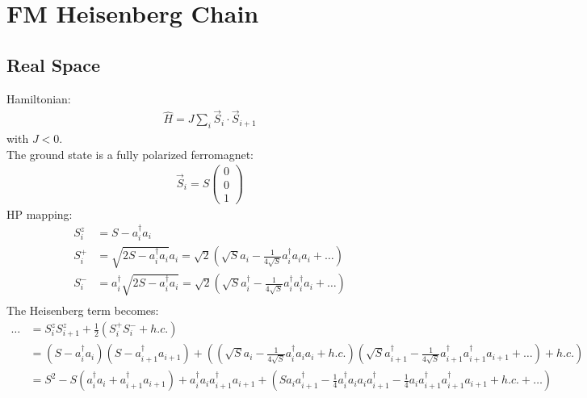 \documentclass{article}
\begin{document}
\section{FM Heisenberg Chain}

\subsection{Real Space}

Hamiltonian:
\begin{align}
	\hat H = J \sum_i \vec S_i \cdot \vec S_{i+1}
\end{align}
with $J < 0$. \\
The ground state is a fully polarized ferromagnet:
\begin{align}
	\vec S_i = S \begin{pmatrix}
		0 \\ 0 \\ 1
	\end{pmatrix}
\end{align}
HP mapping:
\begin{align}
	S_{i}^z &= S - a_{i}^\dagger a_{i} \\
	S_{i}^+ &= \sqrt{2S - a_{i}^\dagger a_{i}} a_{i} = \sqrt{2} \left(\sqrt{S} a_{i} - \frac{1}{4\sqrt{S}} a_{i}^\dagger a_{i} a_{i} + \dots \right) \\
	S_{i}^- &= a_{i}^\dagger \sqrt{2S - a_{i}^\dagger a_{i}} = \sqrt{2} \left(\sqrt{S} a^\dagger_{i} - \frac{1}{4\sqrt{S}} a_{i}^\dagger a^\dagger_{i} a_{i} + \dots \right) \\
\end{align}
The Heisenberg term becomes:
\begin{align}
	\dots &= S_i^z S_{i+1}^z + \frac{1}{2} \left(S_i^+ S_i^- + h.c.\right) \\
%
	&= (S - a_i^\dagger a_i) (S - a_{i+1}^\dagger a_{i+1}) + \left(\left(\sqrt S a_i - \frac{1}{4\sqrt S} a_i^\dagger a_i a_i + h.c.\right) \left(\sqrt S a_{i+1}^\dagger - \frac{1}{4\sqrt S} a_{i+1}^\dagger a_{i+1}^\dagger a_{i+1} + \dots\right) + h.c. \right) \\
%
	&= S^2 - S(a_i^\dagger a_i + a_{i+1}^\dagger a_{i+1}) + a_i^\dagger a_i a_{i+1}^\dagger a_{i+1} + \left( S a_i a_{i+1}^\dagger - \frac{1}{4} a_i^\dagger a_i a_i a_{i+1}^\dagger - \frac{1}{4} a_i a_{i+1}^\dagger a_{i+1}^\dagger a_{i+1} + h.c. + \dots \right)
\end{align}
\end{document}
